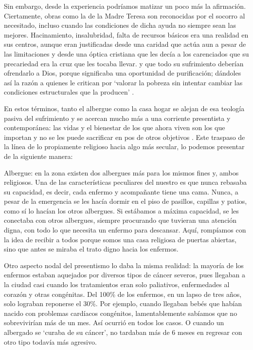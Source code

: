 \documentclass[
  spanish,
  11pt,
  a4paper,
]{scrbook}
\begin{document}
Sin embargo, desde la experiencia podríamos matizar un poco más la
afirmación. Ciertamente, obras como la de la Madre Teresa son
reconocidas por el socorro al necesitado, incluso cuando las condiciones
de dicha ayuda no siempre sean las mejores. Hacinamiento, insalubridad,
falta de recursos básicos era una realidad en sus centros, aunque eran
justificadas desde una caridad que actúa aun a pesar de las limitaciones
y desde una óptica cristiana que les decía a los carenciados que su
precariedad era la cruz que les tocaba llevar. y que todo su sufrimiento
deberían ofrendarlo a Dios, porque significaba una oportunidad de
purificación; dándoles así la razón a quienes le critican por `valorar
la pobreza sin intentar cambiar las condiciones estructurales que la
producen' \autocite[11]{Redfield2011}.

En estos términos, tanto el albergue como la casa hogar se alejan de esa
teología pasiva del sufrimiento y se acercan mucho más a una corriente
presentista y contemporánea: las vidas y el bienestar de los que ahora
viven son los que importan y no se les puede sacrificar en pos de otros
objetivos \autocite[6]{Redfield2011}. Este traspaso de la línea de lo
propiamente religioso hacia algo más secular, lo podemos presentar de la
siguiente manera:

Albergue: en la zona existen dos albergues más para los mismos fines y,
ambos religiosos. Una de las características peculiares del nuestro es
que nunca rebasaba su capacidad, es decir, cada enfermo y acompañante
tiene una cama. Nunca, a pesar de la emergencia se les hacía dormir en
el piso de pasillos, capillas y patios, como sí lo hacían los otros
albergues. Si estábamos a máxima capacidad, se les conectaba con otros
albergues, siempre procurando que tuvieran una atención digna, con todo
lo que necesita un enfermo para descansar. Aquí, rompíamos con la idea
de recibir a todos porque somos una casa religiosa de puertas abiertas,
sino que antes se miraba el trato digno hacia los enfermos.

Otro aspecto nodal del presentismo lo daba la misma realidad: la mayoría
de los enfermos estaban aquejados por diversos tipos de cáncer severos,
pues llegaban a la ciudad casi cuando los tratamientos eran solo
paliativos, enfermedades al corazón y otras congénitas. Del 100\% de los
enfermos, en un lapso de tres años, solo lograban reponerse el 30\%. Por
ejemplo, cuando llegaban bebés que habían nacido con problemas cardíacos
congénitos, lamentablemente sabíamos que no sobrevivirían más de un mes.
Así ocurrió en todos los casos. O cuando un albergado se `curaba de su
cáncer', no tardaban más de 6 meses en regresar con otro tipo todavía
más agresivo.
\end{document}
